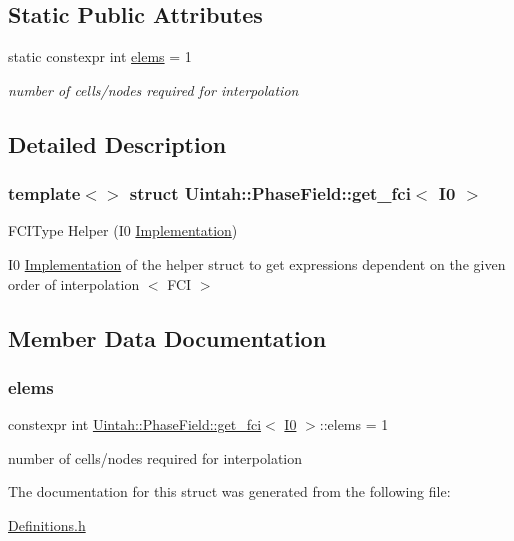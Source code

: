 \subsection*{Static Public Attributes}
\begin{DoxyCompactItemize}
\item 
static constexpr int \hyperlink{structUintah_1_1PhaseField_1_1get__fci_3_01I0_01_4_a2243f1baa820f562bc83a29784e07ca0}{elems} = 1
\begin{DoxyCompactList}\small\item\em number of cells/nodes required for interpolation \end{DoxyCompactList}\end{DoxyCompactItemize}


\subsection{Detailed Description}
\subsubsection*{template$<$$>$\newline
struct Uintah\+::\+Phase\+Field\+::get\+\_\+fci$<$ I0 $>$}

F\+C\+I\+Type Helper (I0 \hyperlink{classUintah_1_1PhaseField_1_1Implementation}{Implementation}) 

I0 \hyperlink{classUintah_1_1PhaseField_1_1Implementation}{Implementation} of the helper struct to get expressions dependent on the given order of interpolation $<$ F\+CI $>$ 

\subsection{Member Data Documentation}
\mbox{\label{structUintah_1_1PhaseField_1_1get__fci_3_01I0_01_4_a2243f1baa820f562bc83a29784e07ca0}} 
\subsubsection{\texorpdfstring{elems}{elems}}
{\footnotesize\ttfamily constexpr int \hyperlink{structUintah_1_1PhaseField_1_1get__fci}{Uintah\+::\+Phase\+Field\+::get\+\_\+fci}$<$ \hyperlink{namespaceUintah_1_1PhaseField_a547ce3002aa97fbd3ef3192a6eec8406abdd8ebcbdfd71d1125937e3012dc45fb}{I0} $>$\+::elems = 1\hspace{0.3cm}{\ttfamily [static]}}



number of cells/nodes required for interpolation 



The documentation for this struct was generated from the following file\+:\begin{DoxyCompactItemize}
\item 
\hyperlink{Definitions_8h}{Definitions.\+h}\end{DoxyCompactItemize}
